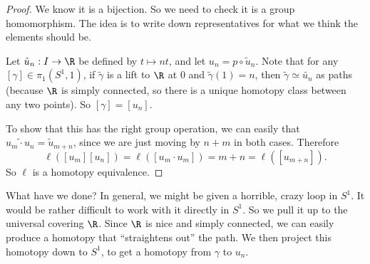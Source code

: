 \documentclass[a4paper]{article}
\begin{document}
\begin{proof}
  We know it is a bijection. So we need to check it is a group homomorphism. The idea is to write down representatives for what we think the elements should be.
  \begin{center}
  \end{center}
  Let $\tilde{u}_n: I \to \R$ be defined by $t \mapsto nt$, and let $u_n = p\circ \tilde{u}_n$. Note that for any $[\gamma] \in \pi_1(S^1, 1)$, if $\tilde{\gamma}$ is a lift to $\R$ at $0$ and $\tilde{\gamma}(1) = n$, then $\tilde{\gamma} \simeq \tilde{u_n}$ as paths (because $\R$ is simply connected, so there is a unique homotopy class between any two points). So $[\gamma] = [u_n]$.

  To show that this has the right group operation, we can easily that $\widetilde{u_m \cdot u_n} = \tilde{u}_{m + n}$, since we are just moving by $n + m$ in both cases. Therefore
  \[
    \ell([u_m][u_n]) = \ell([u_m \cdot u_m]) = m + n = \ell([u_{m + n}]).
  \]
  So $\ell$ is a homotopy equivalence.
\end{proof}
What have we done? In general, we might be given a horrible, crazy loop in $S^1$. It would be rather difficult to work with it directly in $S^1$. So we pull it up to the universal covering $\R$. Since $\R$ is nice and simply connected, we can easily produce a homotopy that ``straightens out'' the path. We then project this homotopy down to $S^1$, to get a homotopy from $\gamma$ to $u_n$.
\end{document}
